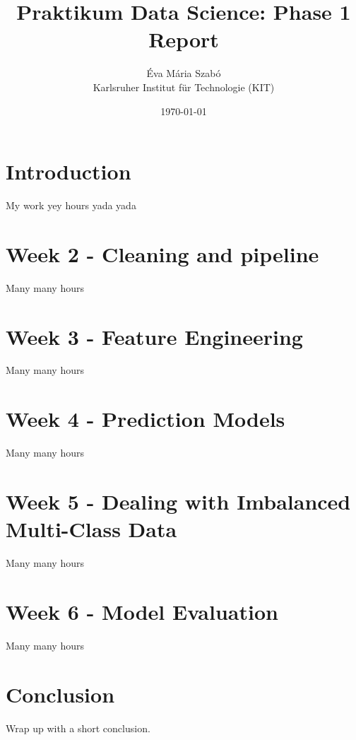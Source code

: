 \documentclass[a4paper,12pt]{article}
\title{Praktikum Data Science: Phase 1 Report}
\author{Éva Mária Szabó \\ \small Karlsruher Institut für Technologie (KIT)}
\date{\today}
\begin{document}
\maketitle
\tableofcontents
\newpage

\section{Introduction}
My work yey hours yada yada

\section{Week 2 - Cleaning and pipeline}
Many many hours

\section{Week 3 - Feature Engineering}
Many many hours

\section{Week 4 - Prediction Models}
Many many hours

\section{Week 5 - Dealing with Imbalanced Multi-Class Data}
Many many hours

\section{Week 6 - Model Evaluation}
Many many hours

\section{Conclusion}
Wrap up with a short conclusion.

%
%
\end{document}
